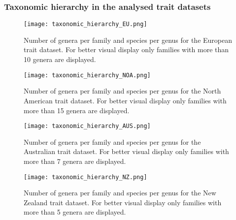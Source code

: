 \documentclass[../Draft_harmonization_paper.tex]{subfiles}
\begin{document}
\subsubsection*{Taxonomic hierarchy in the analysed trait datasets}

\begin{figure}[H]
    \centering
    \texttt{[image: taxonomic\_hierarchy\_EU.png]}
    \caption{Number of genera per family and species per genus for the European trait dataset. For better visual display only families with more than 10 genera are displayed.}
    \label{fig:tax_hierarchy_EU}
\end{figure}

\begin{figure}[H]
    \centering
    \texttt{[image: taxonomic\_hierarchy\_NOA.png]}
    \caption{Number of genera per family and species per genus for the North American trait dataset. For better visual display only families with more than 15 genera are displayed.}
    \label{fig:tax_hierarchy_NOA}
\end{figure}

\begin{figure}[H]
    \centering
    \texttt{[image: taxonomic\_hierarchy\_AUS.png]}
    \caption{Number of genera per family and species per genus for the Australian trait dataset. For better visual display only families with more than 7 genera are displayed.}
    \label{fig:tax_hierarchy_AUS}
\end{figure}

\begin{figure}[H]
    \centering
    \texttt{[image: taxonomic\_hierarchy\_NZ.png]}
    \caption{Number of genera per family and species per genus for the New Zealand trait dataset. For better visual display only families with more than 5 genera are displayed.}
    \label{fig:tax_hierarchy_NZ}
\end{figure}

\newpage


\end{document}
